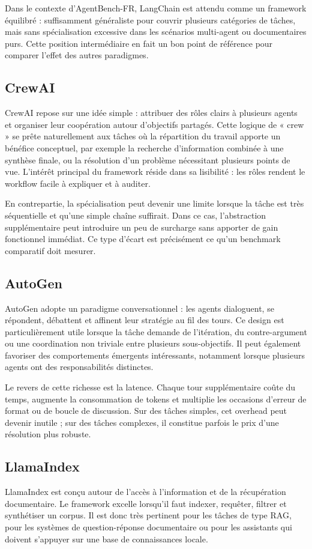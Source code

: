 \documentclass[11pt,a4paper]{article}
\begin{document}
Dans le contexte d'AgentBench-FR, LangChain est attendu comme un framework équilibré : suffisamment généraliste pour couvrir plusieurs catégories de tâches, mais sans spécialisation excessive dans les scénarios multi-agent ou documentaires purs. Cette position intermédiaire en fait un bon point de référence pour comparer l'effet des autres paradigmes.

\subsection{CrewAI}
CrewAI repose sur une idée simple : attribuer des rôles clairs à plusieurs agents et organiser leur coopération autour d'objectifs partagés. Cette logique de « crew » se prête naturellement aux tâches où la répartition du travail apporte un bénéfice conceptuel, par exemple la recherche d'information combinée à une synthèse finale, ou la résolution d'un problème nécessitant plusieurs points de vue. L'intérêt principal du framework réside dans sa lisibilité : les rôles rendent le workflow facile à expliquer et à auditer.

En contrepartie, la spécialisation peut devenir une limite lorsque la tâche est très séquentielle et qu'une simple chaîne suffirait. Dans ce cas, l'abstraction supplémentaire peut introduire un peu de surcharge sans apporter de gain fonctionnel immédiat. Ce type d'écart est précisément ce qu'un benchmark comparatif doit mesurer.

\subsection{AutoGen}
AutoGen adopte un paradigme conversationnel : les agents dialoguent, se répondent, débattent et affinent leur stratégie au fil des tours. Ce design est particulièrement utile lorsque la tâche demande de l'itération, du contre-argument ou une coordination non triviale entre plusieurs sous-objectifs. Il peut également favoriser des comportements émergents intéressants, notamment lorsque plusieurs agents ont des responsabilités distinctes.

Le revers de cette richesse est la latence. Chaque tour supplémentaire coûte du temps, augmente la consommation de tokens et multiplie les occasions d'erreur de format ou de boucle de discussion. Sur des tâches simples, cet overhead peut devenir inutile ; sur des tâches complexes, il constitue parfois le prix d'une résolution plus robuste.

\subsection{LlamaIndex}
LlamaIndex est conçu autour de l'accès à l'information et de la récupération documentaire. Le framework excelle lorsqu'il faut indexer, requêter, filtrer et synthétiser un corpus. Il est donc très pertinent pour les tâches de type RAG, pour les systèmes de question-réponse documentaire ou pour les assistants qui doivent s'appuyer sur une base de connaissances locale.
\end{document}

